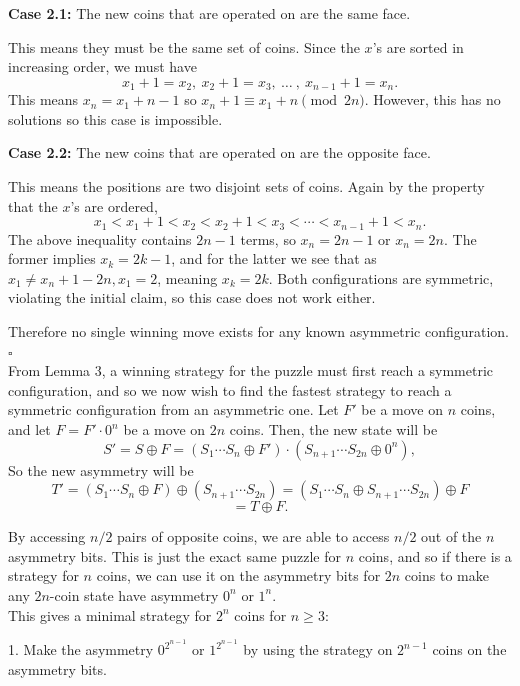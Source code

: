 \documentclass{article}
\begin{document}
    \textbf{Case 2.1:} The new coins that are operated on are the same face.
    
    This means they must be the same set of coins. Since the $x$'s are sorted in increasing order, we must have $$x_1 + 1 = x_2,\ x_2 + 1 = x_3,\ \dots\ ,\ x_{n - 1} + 1 = x_n.$$ This means $x_n = x_1 + n - 1$ so $x_n + 1 \equiv x_1 + n \pmod{2n}$. However, this has no solutions so this case is impossible.

    \textbf{Case 2.2:} The new coins that are operated on are the opposite face.

    This means the positions are two disjoint sets of coins. Again by the property that the $x$'s are ordered,
    $$x_1 < x_1 + 1 < x_2 < x_2 + 1 < x_3 < \cdots < x_{n - 1} + 1 < x_n.$$
    The above inequality contains $2n - 1$ terms, so $x_n = 2n - 1$ or $x_n = 2n$. The former implies $x_k = 2k - 1$, and for the latter we see that as $x_1 \neq x_n + 1 - 2n, x_1 = 2$, meaning $x_k = 2k.$ Both configurations are symmetric, violating the initial claim, so this case does not work either.

    Therefore no single winning move exists for any known asymmetric configuration. $\square$ \\

    From Lemma 3, a winning strategy for the puzzle must first reach a symmetric configuration, and so we now wish to find the fastest strategy to reach a symmetric configuration from an asymmetric one. 
    Let $F'$ be a move on $n$ coins, and let $F = F'\cdot 0^n$ be a move on $2n$ coins. Then, the new state will be $$S' = S\oplus F = (S_1\cdots S_n \oplus F') \cdot (S_{n + 1}\cdots S_{2n}\oplus 0^n),$$
    So the new asymmetry will be $$T' = (S_1\cdots S_n\oplus F) \oplus (S_{n + 1}\cdots S_{2n}) = (S_1\cdots S_n \oplus S_{n + 1}\cdots S_{2n})\oplus F$$ $$= T\oplus F.$$
    
    By accessing $n/2$ pairs of opposite coins, we are able to access $n/2$ out of the $n$ asymmetry bits. This is just the exact same puzzle for $n$ coins, and so if there is a strategy for $n$ coins, we can use it on the asymmetry bits for $2n$ coins to make any $2n$-coin state have asymmetry $0^n$ or $1^n$. \\
    
    This gives a minimal strategy for $2^n$ coins for $n\geq 3$:
    
    1. Make the asymmetry $0^{2^{n - 1}}$ or $1^{2^{n - 1}}$ by using the strategy on $2^{n - 1}$ coins on the asymmetry bits.
\end{document}

